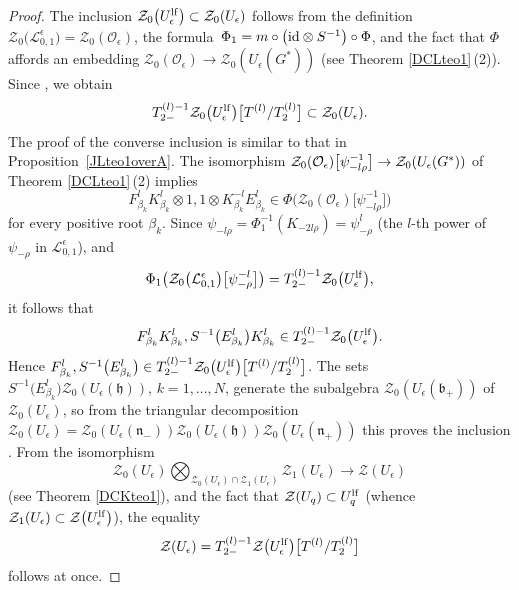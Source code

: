 \documentclass[10pt,a4paper]{amsart}
\numberwithin{equation}{section}
\theoremstyle{definition}
\newcommand{\e}{\epsilon}
\newcommand{\Ll}{{\mathcal L}}
\newcommand{\Oo}{{\mathcal O}}
\newcommand{\ra}{\rightarrow}
\begin{document}
\begin{proof}
The inclusion $\mathcal{Z}_0\big(U_\e^{\rm lf}\big) \subset \mathcal{Z}_0(U_\e)$ follows from the definition $\mathcal{Z}_0\bigl(\Ll_{0,1}^\e\bigr) = \mathcal{Z}_0(\Oo_\e)$, the formula~${\Phi_1 = m\circ \big({\rm id} \otimes S^{-1}\big)\circ \Phi}$, and the fact that $\Phi$ affords an embedding $\mathcal{Z}_0(\Oo_\e)\ra \mathcal{Z}_0(U_\e(G^*))$ (see Theorem \ref{DCLteo1}\,(2)). Since \smash{$T^{(l)}\subset \mathcal{Z}_0(U_\e)$}, we obtain
\[
T_{2-}^{(l)-1}\mathcal{Z}_0\big(U_\e^{\rm lf}\big)\big[T^{(l)}/T_{2}^{(l)}\big]\subset \mathcal{Z}_0(U_\e).
\]
 The proof of the converse inclusion is similar to that in Proposition~\ref{JLteo1overA}. The isomorphism $\smash{\mathcal{Z}_0(\Oo_\e)\big[\psi_{-l\rho}^{-1}\big]}\ra \mathcal{Z}_0(U_\e(G^*))$ of Theorem \ref{DCLteo1}\,(2) implies
\[
F_{\beta_k}^lK_{\beta_k}^l\otimes 1, 1\otimes K_{\beta_k}^{-l}E_{\beta_k}^l\in \Phi\big(\mathcal{Z}_0(\Oo_\e)\big[\psi_{-l\rho}^{-1}\big]\big)
\]
 for every positive root $\beta_k$. Since $\psi_{-l\rho} = \Phi_1^{-1}(K_{-2l\rho})=\psi_{-\rho}^l$ (the $l$-th power of $\psi_{-\rho}$ in $\Ll_{0,1}^\e$), and \[
 \Phi_1\big(\mathcal{Z}_0\bigl(\Ll_{0,1}^\e\bigr)\big[\psi_{-\rho}^{-l}\big]\big) = T_{2-}^{(l)-1}\mathcal{Z}_0\big(U_\e^{\rm lf}\big),
 \] it follows that
\[
F_{\beta_k}^lK_{\beta_k}^l, S^{-1}\bigl(E_{\beta_k}^l\bigr) K_{\beta_k}^l\in T_{2-}^{(l)-1}\mathcal{Z}_0\big(U_\e^{\rm lf}\big).
\]
 Hence $F_{\beta_k}^l, S^{-1}\big(E_{\beta_k}^l\big)\in T_{2-}^{(l)-1}\mathcal{Z}_0\big(U_\e^{\rm lf}\big)\big[T^{(l)}/T_{2}^{(l)}\big]$. The sets $S^{-1}\big(E_{\beta_k}^l\big)\mathcal{Z}_0(U_\e(\mathfrak{h}))$, $k=1,\dots,N$, generate the subalgebra $\mathcal{Z}_0(U_\e(\mathfrak{b}_+))$ of $\mathcal{Z}_0(U_\e)$, so from the triangular decomposition $\mathcal{Z}_0(U_\e)=\mathcal{Z}_0(U_\e(\mathfrak{n}_-))\mathcal{Z}_0(U_\e(\mathfrak{h}))\mathcal{Z}_0(U_\e(\mathfrak{n}_+))$ this proves the inclusion \smash{$\mathcal{Z}_0(U_\e)\subset T_{2-}^{(l) -1}\mathcal{Z}_0\big(U_\e^{\rm lf}\big)\big[T^{(l)}/T_{2}^{(l)}\big]$}.
 From the isomorphism
 \[
 \mathcal{Z}_0(U_\e)\bigotimes_{\mathcal{Z}_0(U_\e)\cap \mathcal{Z}_1(U_\e)} \mathcal{Z}_1(U_\e) \ra \mathcal{Z}(U_\e)
 \]
 (see Theorem \ref{DCKteo1}), and the fact that $\mathcal{Z}(U_q) \subset U_q^{\rm lf}$ \big(whence $\mathcal{Z}_1(U_\e)\subset \mathcal{Z}\big(U_\e^{\rm lf}\big)$\big), the equality \[\mathcal{Z}(U_\e) = T_{2-}^{(l)-1}\mathcal{Z}\big(U_\e^{\rm lf}\big)\big[T^{(l)}/T_{2}^{(l)}\big]\] follows at once.
 \end{proof}
\end{document}
